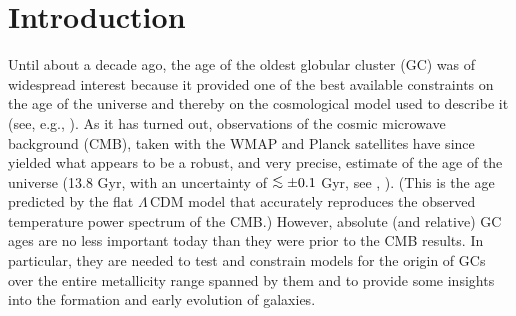 \documentclass[12pt,preprint]{aastex}
\newcommand\lta{\mathrel{\hbox{\raise 0.6 ex \hbox{$<$}\kern
                   -1.8 ex\lower .5 ex\hbox{$\sim$}}}}
\begin{document}
\begin{abstract}
of other metal-poor ([Fe/H] $\lta -1.5$) GCs.  They have been tentatively
attributed to cluster-to-cluster differences in the abundance of helium.
Curiously, GCs that have relatively steep ``M$\,$13-like" SGBs tend to be
massive systems, located at small R$_{\rm G}$, that show the strongest evidence
of {\it in situ} formation of multiple stellar populations.  The clusters in
the other group are typically low-mass systems (with 2--3 exceptions, including
M$\,$3) that, at the present time, should not be able to retain the matter lost
by mass-losing stars due either to the development of GC winds or to
ram-pressure stripping by the halo interstellar medium.  The apparent separation
of the two groups in terms of their {\it present-day} gas retention properties
is difficult to understand if all GCs were initially $\sim 20$ times their
current masses.  The lowest mass systems, in particular,
may have never been massive enough to retain enough gas to produce a 
significant population of second-generation stars.  In this case, the observed
light element abundance variations, which are characteristic of all GCs, were
presumably present in the gas out of which the observed cluster stars formed.
\end{abstract}
 
\section{Introduction}
\label{sec:intro}

Until about a decade ago, the age of the oldest globular cluster (GC) was of
widespread interest because it provided one of the best available constraints on
the age of the universe and thereby on the cosmological model used to describe
it (see, e.g., \citealt{vrm02}).  As it has turned out, observations of the
cosmic microwave background (CMB), taken with the WMAP and Planck satellites
have since yielded what appears to be a robust, and very precise, estimate of
the age of the universe (13.8 Gyr, with an uncertainty of $\lta \pm 0.1$ Gyr,
see \citealt{ksd11}, \citealt{aaa13}).  (This is the age predicted
by the flat $\Lambda\,$CDM model that accurately reproduces the observed
temperature power spectrum of the CMB.)  However, absolute (and relative) GC
ages are no less important today than they were prior to the CMB results.  In
particular, they are needed to test and constrain models for the origin of GCs
over the entire metallicity range spanned by them and to provide some insights
into the formation and early evolution of galaxies.
\end{document}
